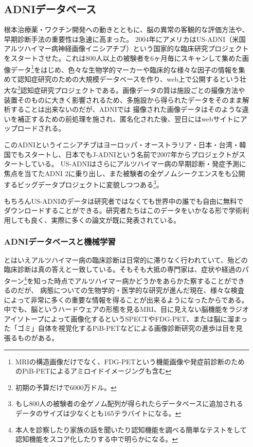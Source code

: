 \subsection{ADNIデータベース}
根本治療薬・ワクチン開発への動きとともに、脳の異常の客観的な評価方法や、早期診断手法の重要性は急速に高まった。
2004年にアメリカはUS-ADNI（米国アルツハイマー病神経画像イニシアチブ）という国家的な臨床研究プロジェクトをスタートさせた。これは800人以上の被験者を6ヶ月毎にスキャンして集めた画像データ\footnote{
MRIの構造画像だけでなく、FDG-PETという機能画像や発症前診断のためのPiB-PETによるアミロイドイメージングも含む}をはじめ、色々な生物学的マーカーや臨床的な様々な因子の情報を集めて認知症研究のための大規模データベースを作り、web上で公開するという壮大な\footnote{初期の予算だけで6000万ドル。}認知症研究プロジェクトである。画像データの質は施設ごとの撮像方法や装置そのものに大きく影響されるため、多施設から得られたデータをそのまま解析することは出来ないのだが、ADNIでは
撮像された画像データはそのような違いを補正するための前処理を施され、匿名化された後、翌日にはwebサイトにアップロードされる。

このADNIというイニシアチブはヨーロッパ・オーストラリア・日本・台湾・韓国でもスタートし、日本でもJ-ADNIという名前で2007年からプロジェクトがスタートしている。
US-ADNIはさらにアルツハイマー病の早期診断・発症予測に焦点を当てたADNI 2に乗り出し、また被験者の全ゲノムシークエンスをも公開するビッグデータプロジェクトに変貌しつつある\footnote{もし800人の被験者の全ゲノム配列が得られたらデータベースに追加されるデータのサイズは少なくとも165テラバイトになる。}。

もちろんUS-ADNIのデータは研究者ではなくても世界中の誰でも自由に無料でダウンロードすることができる。研究者たちはこのデータをいかなる形で学術利用しても良く、実際に多くの論文が既に発表されている。

\subsubsection{ADNIデータベースと機械学習}



とはいえアルツハイマー病の臨床診断は日常的に滞りなく行われていて、殆どの臨床診断は真の答えと一致している。そもそも大抵の専門家は、症状や経過のパターン\footnote{本人を診察したり家族の話を聞いたり認知機能を調べる簡単なテストをして認知機能をスコア化したりする中で明らかになる。}を知った時点でアルツハイマー病かどうかをあらかた察することができるのだが、
病態についての生物学的・医学的な研究が進んだ現在、様々な検査によって非常に多くの重要な情報を得ることが出来るようになったからである。中でも、脳というハードウェアの形態を見るMRI、目に見えない脳機能をラジオアイソトープによって画像化するというSPECTやFDG-PET、または脳に溜まった「ゴミ」自体を視覚化するPiB-PETなどによる画像診断研究の進歩は目を見張るものがある。



